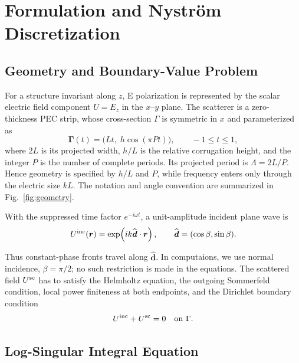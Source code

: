 \documentclass[conference]{IEEEtran}
\begin{document}
\section{Formulation and Nystr\"om Discretization}
\label{sec:method}

\subsection{Geometry and Boundary-Value Problem}

For a structure invariant along $z$, E polarization is represented by the
scalar electric field component $U=E_z$ in the $x$--$y$ plane.  The scatterer is a
zero-thickness PEC strip, whose cross-section $\Gamma$ is symmetric in $x$ and parameterized as
\begin{equation}
 \boldsymbol \Gamma(t)=\bigl(Lt,\;h\cos(\pi Pt)\bigr),
 \qquad -1\leq t\leq 1,
 \label{eq:geometry}
\end{equation}
where $2L$ is its projected width, $h/L$ is the relative corrugation height,
and the integer $P$ is the number of complete periods.  Its projected period
is $\Lambda=2L/P$.  Hence geometry is specified by $h/L$ and $P$, while
frequency enters only through the electric size $kL$.  The notation and
angle convention are summarized in Fig.~\ref{fig:geometry}.

With the suppressed time factor $e^{-i\omega t}$, a unit-amplitude incident
plane wave is
\begin{equation}
 U^{\rm inc}(\boldsymbol r)
 =\exp\!\left(ik\widehat{\boldsymbol d}\mathbin{\cdot}\boldsymbol r\right),
 \qquad
 \widehat{\boldsymbol d}=(\cos\beta,\sin\beta).
 \label{eq:incident}
\end{equation}

Thus constant-phase fronts travel along $\widehat{\boldsymbol d}$.  In computaions, we
use normal incidence, $\beta=\pi/2$; no such restriction is made in the
equations.  The scattered field $U^{\rm sc}$ has to satisfy the Helmholtz equation,
the outgoing Sommerfeld condition, local power finiteness at both endpoints,
and the Dirichlet boundary condition
\begin{equation}
 U^{\rm inc}+U^{\rm sc}=0 \quad \text{on }\Gamma .
 \label{eq:pec}
\end{equation}

\subsection{Log-Singular Integral Equation}
\end{document}
